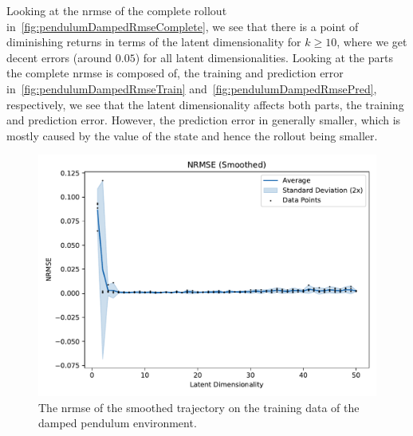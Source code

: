 			Looking at the \ac{nrmse} of the complete rollout in~\autoref{fig:pendulumDampedRmseComplete}, we see that there is a point of diminishing returns in terms of the latent dimensionality for \( k \geq 10 \), where we get decent errors (around \( 0.05 \)) for all latent dimensionalities. Looking at the parts the complete \ac{nrmse} is composed of, the training and prediction error in~\autoref{fig:pendulumDampedRmseTrain} and~\autoref{fig:pendulumDampedRmsePred}, respectively, we see that the latent dimensionality affects both parts, the training and prediction error. However, the prediction error in generally smaller, which is mostly caused by the value of the state and hence the rollout being smaller.

			\begin{figure}
				\centering
				\includegraphics[width=0.7\linewidth]{figures/results/pendulum-damped/latent-dim/comparison-rmse-smoothed-normalized-mean-vs-latent-dim.pdf}
				\caption{The \ac{nrmse} of the smoothed trajectory on the training data of the damped pendulum environment.}
				\label{fig:pendulumDampedRmseSmoothed}
			\end{figure}


